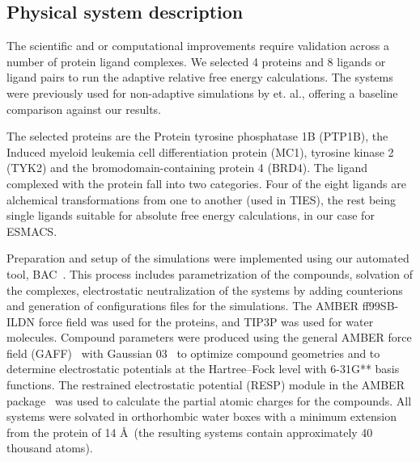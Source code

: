 \subsection{Physical system description}

The scientific and or computational improvements require validation across a number of protein ligand complexes. We selected 4 proteins and 8 ligands or ligand pairs to run the adaptive relative free energy calculations. The systems were previously used for non-adaptive simulations by \cite{} et. al., offering a baseline comparison against our results. 

The selected proteins are the Protein tyrosine phosphatase 1B (PTP1B), the Induced myeloid leukemia cell differentiation protein (MC1), tyrosine kinase 2 (TYK2) and the bromodomain-containing protein 4 (BRD4). The ligand complexed with the protein fall into two categories. Four of the eight ligands are alchemical transformations from one to another (used in TIES), the rest being single ligands suitable for absolute free energy calculations, in our case for ESMACS.

Preparation and setup of the simulations were implemented using our automated tool, BAC~\cite{Sadiq2008}. This process includes parametrization of the compounds, solvation of the complexes, electrostatic neutralization of the systems by adding counterions and generation of configurations files for the simulations. The AMBER ff99SB-ILDN \cite{Lindorff-Larsen2010} force field was used for the proteins, and TIP3P was used for water molecules. Compound parameters were produced using the general AMBER force field (GAFF)~\cite{Wang2004} with Gaussian 03~\cite{Frisch} to optimize compound geometries and to determine electrostatic potentials at the Hartree–Fock level with 6-31G** basis functions. The restrained electrostatic potential (RESP) module in the AMBER package~\cite{Case2005} was used to calculate the partial atomic charges for the compounds. All systems were solvated in orthorhombic water boxes with a minimum extension from the protein of 14 \AA\ (the resulting systems contain approximately 40 thousand atoms).

